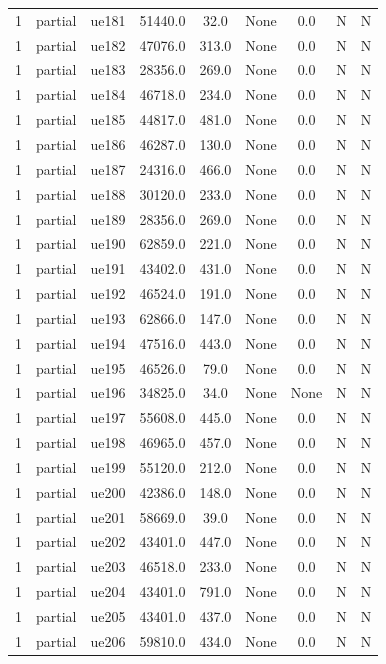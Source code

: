 \begin{table}[ht]
\begin{tabular}{|c|c|c|c|c|c|c|c|c|}
1 & partial & ue181 & 51440.0 & 32.0 & None & 0.0 & N & N \\
1 & partial & ue182 & 47076.0 & 313.0 & None & 0.0 & N & N \\
1 & partial & ue183 & 28356.0 & 269.0 & None & 0.0 & N & N \\
1 & partial & ue184 & 46718.0 & 234.0 & None & 0.0 & N & N \\
1 & partial & ue185 & 44817.0 & 481.0 & None & 0.0 & N & N \\
1 & partial & ue186 & 46287.0 & 130.0 & None & 0.0 & N & N \\
1 & partial & ue187 & 24316.0 & 466.0 & None & 0.0 & N & N \\
1 & partial & ue188 & 30120.0 & 233.0 & None & 0.0 & N & N \\
1 & partial & ue189 & 28356.0 & 269.0 & None & 0.0 & N & N \\
1 & partial & ue190 & 62859.0 & 221.0 & None & 0.0 & N & N \\
1 & partial & ue191 & 43402.0 & 431.0 & None & 0.0 & N & N \\
1 & partial & ue192 & 46524.0 & 191.0 & None & 0.0 & N & N \\
1 & partial & ue193 & 62866.0 & 147.0 & None & 0.0 & N & N \\
1 & partial & ue194 & 47516.0 & 443.0 & None & 0.0 & N & N \\
1 & partial & ue195 & 46526.0 & 79.0 & None & 0.0 & N & N \\
1 & partial & ue196 & 34825.0 & 34.0 & None & None & N & N \\
1 & partial & ue197 & 55608.0 & 445.0 & None & 0.0 & N & N \\
1 & partial & ue198 & 46965.0 & 457.0 & None & 0.0 & N & N \\
1 & partial & ue199 & 55120.0 & 212.0 & None & 0.0 & N & N \\
1 & partial & ue200 & 42386.0 & 148.0 & None & 0.0 & N & N \\
1 & partial & ue201 & 58669.0 & 39.0 & None & 0.0 & N & N \\
1 & partial & ue202 & 43401.0 & 447.0 & None & 0.0 & N & N \\
1 & partial & ue203 & 46518.0 & 233.0 & None & 0.0 & N & N \\
1 & partial & ue204 & 43401.0 & 791.0 & None & 0.0 & N & N \\
1 & partial & ue205 & 43401.0 & 437.0 & None & 0.0 & N & N \\
1 & partial & ue206 & 59810.0 & 434.0 & None & 0.0 & N & N \\

\end{tabular}
\end{table}
